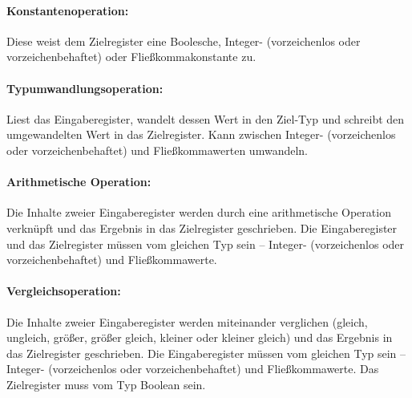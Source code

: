 \documentclass[twoside,a4paper,fleqn,12pt]{book}
\begin{document}


\paragraph{Konstantenoperation:} Diese weist dem Zielregister eine Boolesche, Integer- (vorzeichenlos oder vorzeichenbehaftet) oder
Fließkommakonstante zu.



\paragraph{Typumwandlungsoperation:} Liest das Eingaberegister, wandelt dessen Wert in den Ziel-Typ und schreibt den umgewandelten Wert in das Zielregister.
Kann zwischen Integer- (vorzeichenlos oder vorzeichenbehaftet) und Fließkommawerten umwandeln.



\paragraph{Arithmetische Operation:} Die Inhalte zweier Eingaberegister 
werden durch eine arithmetische Operation verknüpft und das Ergebnis in das Zielregister geschrieben.
Die Eingaberegister und das Zielregister müssen vom gleichen Typ sein -- Integer- (vorzeichenlos oder vorzeichenbehaftet) und Fließkommawerte.



\paragraph{Vergleichsoperation:} Die Inhalte zweier Eingaberegister 
werden miteinander verglichen (gleich, ungleich, größer, größer gleich, kleiner oder kleiner gleich) und das Ergebnis in das Zielregister geschrieben.
Die Eingaberegister müssen vom gleichen Typ sein -- Integer- (vorzeichenlos oder vorzeichenbehaftet) und Fließkommawerte.
Das Zielregister muss vom Typ Boolean sein.
\end{document}
